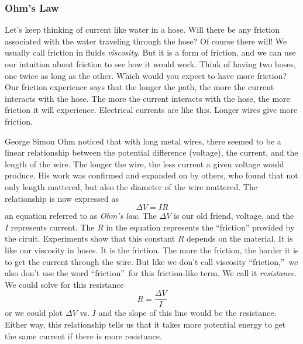 \subsubsection{Ohm's Law}

Let's keep thinking of current like water in a hose. Will there be any
friction associated with the water traveling through the hose? Of course
there will! We usually call friction in fluids \emph{viscosity}. But it is a
form of friction, and we can use our intuition about friction to see
how it would work. Think of having two hoses, one twice as long as the
other. Which would you expect to have more friction? 
Our friction experience says that the longer the path, the more the
current interacts with the hose. The more the current interacts with the hose,
the more friction it will experience. 
Electrical currents are like this. Longer wires
give more friction.

George Simon Ohm noticed that with long metal wires, there seemed to be a
linear relationship between the potential difference (voltage), the current,
and the length of the wire. The longer the wire, the less current a given
voltage would produce. His
work was confirmed and expanded on by others, who found that not only length
mattered, but also the diameter of the wire mattered. The relationship is
now expressed as
\begin{equation}
\Delta V=IR
\end{equation}
an equation referred to as \emph{Ohm's law}. The
$\Delta V$ is our old friend, voltage, and the $I$ represents
current. The $R$ in the equation represents the ``friction'' provided by the 
ciruit.
Experiments show that this constant $R$ depends on the material. It is like
our viscosity in hoses. It is the friction. The more the friction, the
harder it is to get the current through the wire. But like we don't call
viscosity \textquotedblleft friction,\textquotedblright\ we also don't use
the word \textquotedblleft friction\textquotedblright\ for this
friction-like term. We call it \emph{resistance.} We could solve for this
resistance 
\begin{equation}
R=\frac{\Delta V}{I}
\end{equation}
or we could plot $\Delta V$ vs. $I$ and the slope of this line would be the
resistance.
Either way, this relationship
tells us that it takes more potential energy to get the same current if
there is more resistance.

